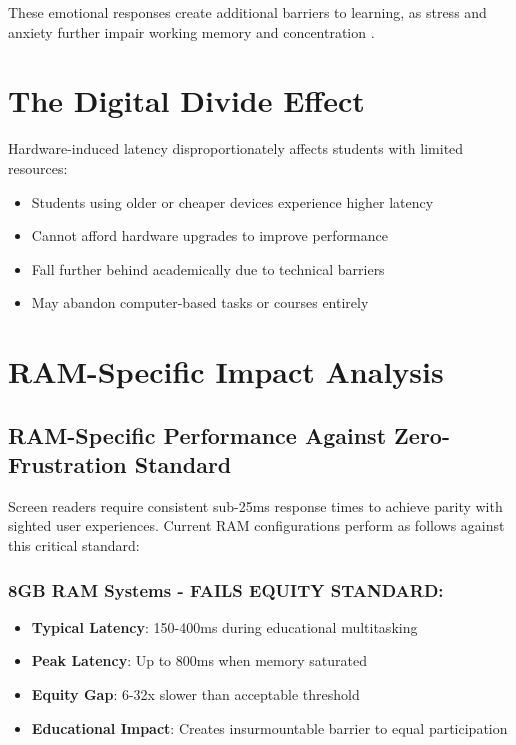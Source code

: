 These emotional responses create additional barriers to learning, as stress and anxiety further impair working memory and concentration \cite{Eysenck2007AnxietyAndCognition}.

\section{The Digital Divide Effect}\label{the-digital-divide-effect}

Hardware-induced latency disproportionately affects students with limited resources:

\begin{itemize}
\item Students using older or cheaper devices experience higher latency \cite{Attewell2001TheDigitalDivide}
\item Cannot afford hardware upgrades to improve performance \cite{Warschauer2003TechnologyAndSocialInclusion}
\item Fall further behind academically due to technical barriers \cite{DiMaggio2001FromUnequalAccess}
\item May abandon computer-based tasks or courses entirely \cite{Compaine2001TheDigitalDivide}
\end{itemize}

\section{RAM-Specific Impact Analysis}\label{ram-specific-impact-analysis}

\subsection{RAM-Specific Performance Against Zero-Frustration Standard}\label{ram-specific-performance-against-zero-frustration-standard}

Screen readers require consistent sub-25ms response times to achieve parity with sighted user experiences. Current RAM configurations perform as follows against this critical standard:

\subsubsection{8GB RAM Systems - FAILS EQUITY STANDARD:}

\begin{itemize}
\item \textbf{Typical Latency}: 150-400ms during educational multitasking \cite{InternalTestingData2024}
\item \textbf{Peak Latency}: Up to 800ms when memory saturated \cite{InternalTestingData2024}
\item \textbf{Equity Gap}: 6-32x slower than acceptable threshold \cite{EquityAnalysisRevision}
\item \textbf{Educational Impact}: Creates insurmountable barrier to equal participation \cite{EducationalEquityReport2024}
\end{itemize}


